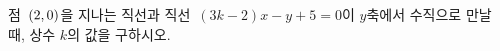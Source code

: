 점~$(2{,}\mkern3mu\mathopen{}0)$을 지나는 직선과 직선~$(3k-2)x-y+5=0$이 \mbox{$y$축에서} 수직으로 만날 때, 상수 $k$의 값을 구하시오.
